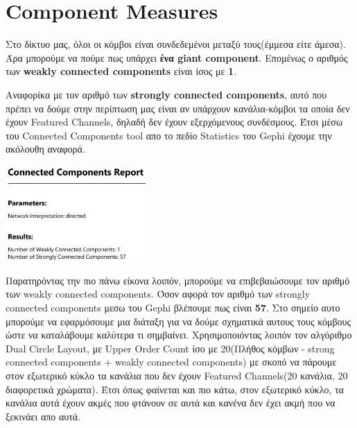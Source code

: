 \documentclass[12pt]{article}
\begin{document}
	
	\newpage
	\section{Component Measures}
	Στο δίκτυο μας, όλοι οι κόμβοι είναι συνδεδεμένοι μεταξύ τους(έμμεσα είτε άμεσα). Άρα μπορούμε να πούμε πως υπάρχει \textbf{ένα giant component}. Επομένως ο αριθμός των \textbf{weakly connected components} είναι ίσος με \textbf{1}. \par 
	Αναφορίκα με τον αριθμό των \textbf{strongly connected components}, αυτό που πρέπει να δούμε στην περίπτωση μας είναι αν υπάρχουν κανάλια-κόμβοι τα οποία δεν έχουν Featured Channels, δηλαδή δεν έχουν εξερχόμενους συνδέσμους. Έτσι μέσω του Connected Components tool απο το πεδίο Statistics του Gephi έχουμε την ακόλουθη αναφορά.
	\par
	\begin{center}
		\includegraphics[width=0.4\textwidth]{photos-files/section5/connected_components_report.JPG}
	\end{center}
	\par
	Παρατηρόντας την πιο πάνω είκονα λοιπόν, μπορούμε να επιβεβαιώσουμε τον αριθμό των weakly connected components. Όσον αφορά τον αριθμό των strongly connected components μεσω του Gephi βλέπουμε πως είναι \textbf{57}. Στο σημείο αυτο μπορούμε να εφαρμόσουμε μια διάταξη για να δούμε σχηματικά αυτους τους κόμβους ώστε να καταλάβουμε καλύτερα τι σημβαίνει. Χρησιμοποιόντας λοιπόν τον αλγόριθμο Dual Circle Layout, με Upper Order Count ίσο με 20(Πλήθος κόμβων - strong connected components + weakly connected components) με σκοπό να πάρουμε στον εξωτερικό κύκλο τα κανάλια που δεν έχουν Featured Channels(20 κανάλια, 20 διαφορετικά χρώματα). Έτσι όπως φαίνεται και πιο κάτω, στον εξωτερικό κύκλο, τα κανάλια αυτά έχουν ακμές που φτάνουν σε αυτά και κανένα δεν έχει ακμή που να ξεκινάει απο αυτά.
\end{document}
